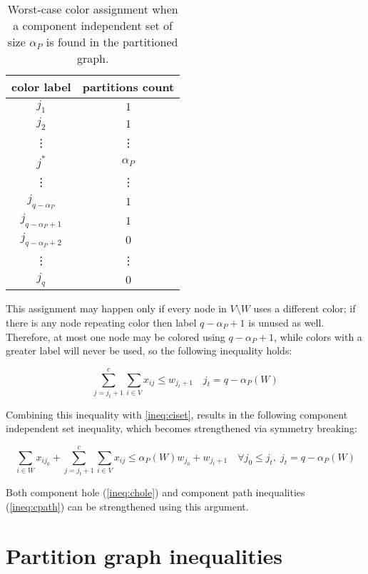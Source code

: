\begin{table}
\centering	
\begin{tabular}{cc}
\hline
\textbf{color label} & \textbf{partitions count} \\
\hline
$j_1$ & $1$\\
$j_2$ & $1$\\
\vdots & \vdots \\
$j^*$ & $\alpha_P$ \\
\vdots & \vdots \\
$j_{q - \alpha_P}$ & $1$\\
$j_{q - \alpha_P + 1}$ & $1$\\
$j_{q - \alpha_P + 2}$ & $0$\\
\vdots & \vdots \\
$j_{q}$ & $0$\\
\hline
\end{tabular}
\caption{Worst-case color assignment when a component independent set of size $\alpha_P$ is found in the partitioned graph.}
	\label{table:cisetcoloring}
\end{table}

This assignment may happen only if every node in $V \setminus W$ uses a different color; if there is any node repeating color then label $q - \alpha_P + 1$ is unused as well. Therefore, at most one node may be colored using $q - \alpha_P + 1$, while colors with a greater label will never be used, so the following inequality holds:

\begin{equation}
\label{ineq:cisetbshigh}
\sum ^c _{j = j_t + 1} \sum _{i \in V} x_{ij} \leq w_{j_t + 1} \quad j_t = q - \alpha_P(W)
\end{equation}

Combining this inequality with \ref{ineq:ciset}, results in the following component independent set inequality, which becomes strengthened via symmetry breaking:

\begin{equation}
\label{ineq:cisetbs}
\sum_{i \in W} x_{ij_0} + \sum ^c _{j = j_t + 1} \sum _{i \in V} x_{ij} \leq \alpha_P(W) w_{j_0} + w_{j_t + 1} \quad \forall j_0 \leq j_t, \; j_t = q - \alpha_P(W)
\end{equation}

Both component hole (\ref{ineq:chole}) and component path inequalities (\ref{ineq:cpath}) can be strengthened using this argument.

\section{Partition graph inequalities}

